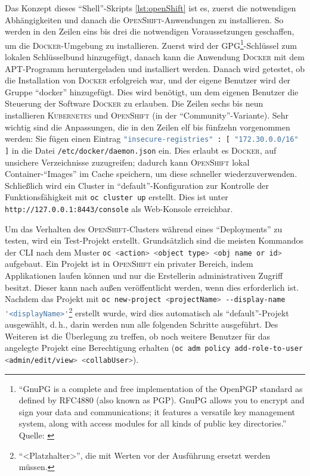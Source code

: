 Das Konzept dieses \enquote{Shell}-Skripts \vref{lst:openShift} ist es, zuerst die notwendigen Abhängigkeiten und danach die \textsc{OpenShift}-Anwendungen zu installieren. So werden in den Zeilen eins bis drei die notwendigen Voraussetzungen geschaffen, um die \textsc{Docker}-Umgebung zu installieren. Zuerst wird der \textsc{GPG}\footnote{\enquote{GnuPG is a complete and free implementation of the OpenPGP standard as defined by RFC4880 (also known as PGP). GnuPG allows you to encrypt and sign your data and communications; it features a versatile key management system, along with access modules for all kinds of public key directories.} Quelle: \cite{the_people_of_the_gnupg_project_gnu_2020}}-Schlüssel zum lokalen Schlüsselbund hinzugefügt, danach kann die Anwendung \textsc{Docker} mit dem \ac{APT}-Programm heruntergeladen und installiert werden. Danach wird getestet, ob die Installation von \textsc{Docker} erfolgreich war, und der eigene Benutzer wird der Gruppe \enquote{docker} hinzugefügt. Dies wird benötigt, um dem eigenen Benutzer die Steuerung der Software \textsc{Docker} zu erlauben. Die Zeilen sechs bis neun installieren \textsc{Kubernetes} und \textsc{OpenShift} (in der \enquote{Community}-Variante). Sehr wichtig sind die Anpassungen, die in den Zeilen elf bis fünfzehn vorgenommen werden: Sie fügen einen Eintrag \lstinline[language=bash]|"insecure-registries" : [ "172.30.0.0/16" ]| in die Datei \lstinline[language=bash]|/etc/docker/daemon.json| ein. Dies erlaubt es \textsc{Docker}, auf unsichere Verzeichnisse zuzugreifen; dadurch kann \textsc{OpenShift} lokal Container-\enquote{Images} im Cache speichern, um diese schneller wiederzuverwenden. Schließlich wird ein Cluster in \enquote{default}-Konfiguration zur Kontrolle der Funktionsfähigkeit mit \lstinline[language=bash]|oc cluster up| erstellt. Dies ist unter \lstinline[language=HTML, breaklines=true]|http://127.0.0.1:8443/console| als Web-Konsole erreichbar.
\par
Um das Verhalten des \textsc{OpenShift}-Clusters während eines \enquote{Deployments} zu testen, wird ein Test-Projekt erstellt. Grundsätzlich sind die meisten Kommandos der \ac{CLI} nach dem Muster \lstinline[language=sh]|oc <action> <object type> <obj name or id>|\autocite[vgl.][]{red_hat_inc_cli_2020} aufgebaut. Ein Projekt ist in \textsc{OpenShift} ein privater Bereich, indem Applikationen laufen können und nur die Erstellerin administrativen Zugriff besitzt. Dieser kann nach außen veröffentlicht werden, wenn dies erforderlich ist. Nachdem das Projekt mit \lstinline[language=bash]|oc new-project <projectName> --display-name '<displayName>'|\footnote{\enquote{<Platzhalter>}, die mit Werten vor der Ausführung ersetzt werden müssen.} erstellt wurde, wird dies automatisch als \enquote{default}-Projekt ausgewählt, d.\,h., darin werden nun alle folgenden Schritte ausgeführt. Des Weiteren ist die Überlegung zu treffen, ob noch weitere Benutzer für das angelegte Projekt eine Berechtigung erhalten (\lstinline[language=bash]|oc adm policy add-role-to-user <admin/edit/view> <collabUser>|). 
